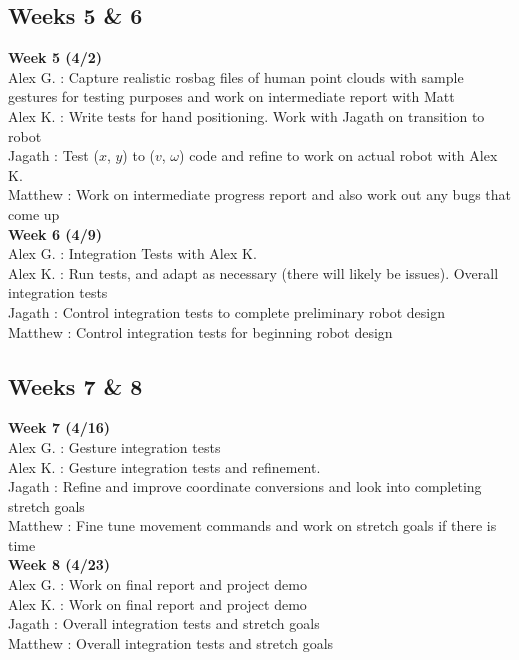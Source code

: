 \documentclass[a4paper]{article}
\begin{document}
\subsection{Weeks 5 \& 6}

\textbf{Week 5 (4/2)} \\
Alex G. : Capture realistic rosbag files of human point clouds with sample gestures for testing purposes and work on intermediate report with Matt\\
Alex K. : Write tests for hand positioning. Work with Jagath on transition to robot\\
Jagath : Test ($x$, $y$) to ($v$, $\omega$) code and refine to work on actual robot with Alex K.\\
Matthew : Work on intermediate progress report and also work out any bugs that come up \\
\textbf{Week 6 (4/9)} \\
Alex G. : Integration Tests with Alex K. \\
Alex K. : Run tests, and adapt as necessary (there will likely be issues). Overall integration tests\\
Jagath : Control integration tests to complete preliminary robot design\\
Matthew : Control integration tests for beginning robot design \\

\subsection{Weeks 7 \& 8}

\textbf{Week 7 (4/16)} \\
Alex G. : Gesture integration tests \\
Alex K. : Gesture integration tests and refinement.\\
Jagath : Refine and improve coordinate conversions and look into completing stretch goals\\
Matthew : Fine tune movement commands and work on stretch goals if there is time\\
\textbf{Week 8 (4/23)} \\
Alex G. : Work on final report and project demo\\
Alex K. : Work on final report and project demo\\
Jagath : Overall integration tests and stretch goals\\
Matthew : Overall integration tests and stretch goals \\
\end{document}
